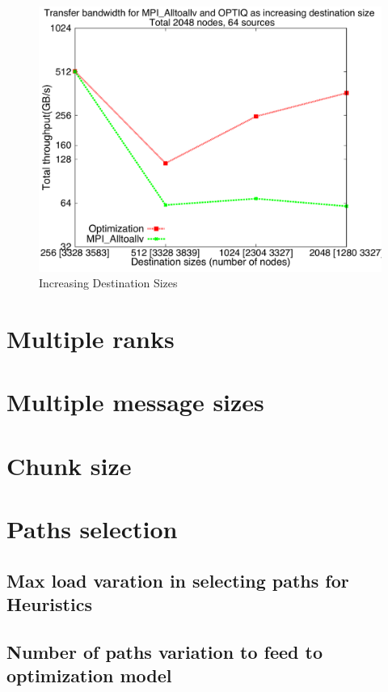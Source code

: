 \documentclass[letter]{article}
\begin{document}
\begin{figure}[h]
\vspace{-0.1in}
\centering
\includegraphics[scale=0.40]{report_figures/incrsize/incrsize_4k.pdf}
\vspace{-0.1in}
\caption{Increasing Destination Sizes}
\vspace{-0.1in}
\label{fig:incrsize_4k}
\end{figure}

\clearpage
\newpage





\clearpage
\newpage

\section{Multiple ranks}

\section{Multiple message sizes}

\section{Chunk size}

\section{Paths selection}

\subsection{Max load varation in selecting paths for Heuristics}

\subsection{Number of paths variation to feed to optimization model}
\end{document}
